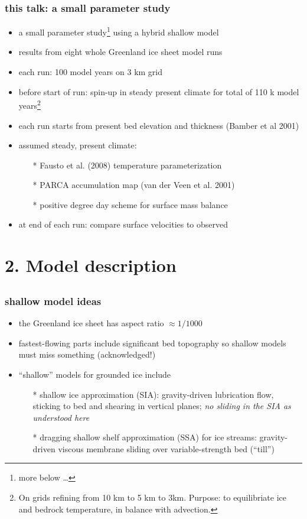 \documentclass{beamer}
\begin{document}
\begin{frame}
  \frametitle{this talk: a small parameter study}

\begin{itemize}
\item a small parameter study\footnote{more below \dots} using a hybrid shallow model
\item results from eight whole Greenland ice sheet model runs
\item each run: 100 model years on 3 km grid
\item before start of run: spin-up in steady present climate for total of 110 k model years\footnote{\tiny On grids refining from 10 km to 5 km to 3km.  Purpose: to equilibriate ice and bedrock temperature, in balance with advection.}
\item each run starts from present bed elevation and thickness (Bamber et al 2001)
\item assumed steady, present climate:
  \begin{itemize}
  \item[*] Fausto et al. (2008) temperature parameterization
  \item[*] PARCA accumulation map (van der Veen et al. 2001)
  \item[*] positive degree day scheme for surface mass balance
  \end{itemize}
\item at end of each run: compare surface velocities to observed 
\end{itemize}
\end{frame}


\section{2. Model description}\subsection*{}

\begin{frame}
  \frametitle{shallow model ideas}

\small
\begin{itemize}
\item the Greenland ice sheet has aspect ratio $\approx 1/1000$
\item fastest-flowing parts include significant bed topography so shallow models must miss something (acknowledged!)
\item ``shallow'' models for grounded ice include
  \begin{itemize}
  \item[*] shallow ice approximation (SIA): gravity-driven lubrication flow, sticking to bed and shearing in vertical planes; \emph{no sliding in the SIA as understood here}
  \item[*] dragging shallow shelf approximation (SSA) for ice streams: gravity-driven viscous membrane sliding over variable-strength bed (``till'')
  \end{itemize}
\end{itemize}

\end{frame}
\end{document}
